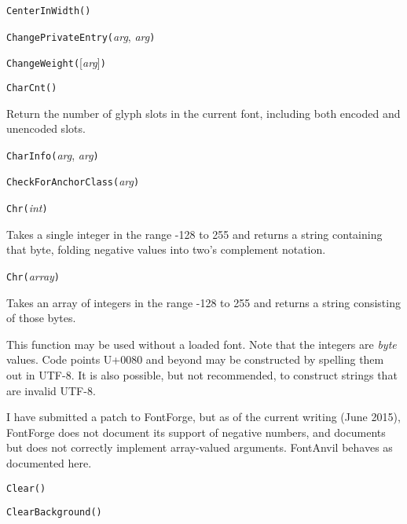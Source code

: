 
\noindent\texttt{CenterInWidth(}\texttt{)}


\noindent\texttt{ChangePrivateEntry(}\textit{arg}, \textit{arg}\texttt{)}


\noindent\texttt{ChangeWeight(}[\textit{arg}]\texttt{)}


\noindent\texttt{CharCnt()}

Return the number of glyph slots in the current font, including both encoded
and unencoded slots.


\noindent\texttt{CharInfo(}\textit{arg}, \textit{arg}\texttt{)}


\noindent\texttt{CheckForAnchorClass(}\textit{arg}\texttt{)}


\noindent\texttt{Chr(}\textit{int}\texttt{)}

Takes a single integer in the range -128 to 255 and returns a string
containing that byte, folding negative values into two's complement
notation.

\noindent\texttt{Chr(}\textit{array}\texttt{)}

Takes an array of integers in the range -128 to 255 and returns a string
consisting of those bytes.

This function may be used without a loaded font.  Note that the integers are
\emph{byte} values.  Code points U+0080 and beyond may be constructed by
spelling them out in UTF-8.  It is also possible, but not recommended, to
construct strings that are invalid UTF-8.

I \FFdiff have submitted a patch to FontForge, but as of the current writing
(June 2015), FontForge does not document its support of negative numbers,
and documents but does not correctly implement array-valued arguments. 
FontAnvil behaves as documented here.


\noindent\texttt{Clear()}


\noindent\texttt{ClearBackground(}\texttt{)}


